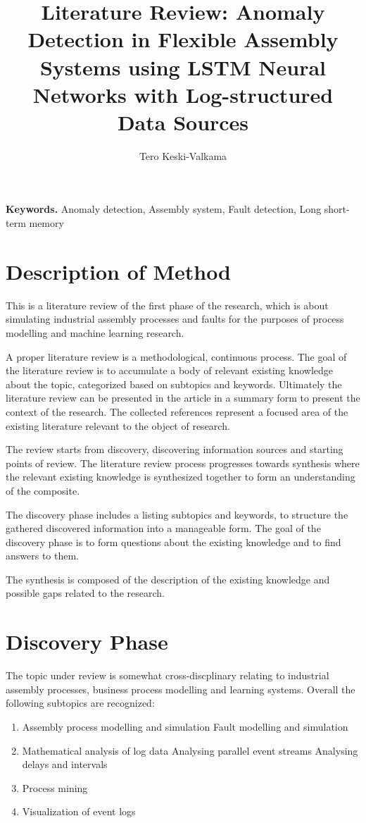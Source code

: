 \documentclass[a4paper,10pt]{article}
\title{Literature Review: Anomaly Detection in Flexible Assembly Systems using LSTM Neural Networks with Log-structured Data Sources}
\author{Tero Keski-Valkama}
\begin{document}
\maketitle

\smallskip
\noindent \textbf{Keywords.} Anomaly detection, Assembly system, Fault detection, Long short-term memory

\section{Description of Method}

This is a literature review of the first phase of the research, which is about simulating industrial assembly processes and faults for the purposes of
process modelling and machine learning research.

A proper literature review is a methodological, continuous process. The goal of the literature review is to accumulate a body of relevant existing knowledge
about the topic, categorized based on subtopics and keywords.
Ultimately the literature review can be presented in the article in a summary form to present the context of the research.
The collected references represent a focused area of the existing literature relevant to the object of research.

The review starts from discovery, discovering information sources and starting points of review. The literature review process progresses towards synthesis
where the relevant existing knowledge is synthesized together to form an understanding of the composite.

The discovery phase includes a listing subtopics and keywords, to structure the gathered discovered information into a manageable form. The goal
of the discovery phase is to form questions about the existing knowledge and to find answers to them.

The synthesis is composed of the description of the existing knowledge and possible gaps related to the research.

\section{Discovery Phase}

The topic under review is somewhat cross-discplinary relating to industrial assembly processes, business process modelling and learning systems.
Overall the following subtopics are recognized:
\begin{enumerate}
 \item Assembly process modelling and simulation
   \subitem Fault modelling and simulation
 \item Mathematical analysis of log data
   \subitem Analysing parallel event streams
   \subitem Analysing delays and intervals
 \item Process mining
 \item Visualization of event logs
\end{enumerate}
\end{document}
